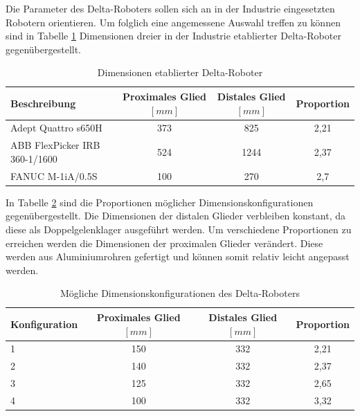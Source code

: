 \documentclass[Bachelor, BMR, ngerman]{twbook}
\begin{document}
    Die Parameter des Delta-Roboters sollen sich an in der Industrie eingesetzten Robotern orientieren. Um folglich eine angemessene Auswahl treffen zu können sind in Tabelle \ref{tab:etablierte-delta-rob} Dimensionen dreier in der Industrie etablierter Delta-Roboter gegenübergestellt.
    \begin{table}[H]
        \centering
        \caption{Dimensionen etablierter Delta-Roboter }\label{tab:etablierte-delta-rob}
            \begin{tabular}{| l | c | c | c |}\hline 
                \rowcolor[gray]{0.8} Beschreibung & Proximales Glied $[mm]$ & Distales Glied $[mm]$  & Proportion\\\hline
                Adept Quattro s650H & 373 & 825 & 2,21\\\hline
                ABB FlexPicker IRB 360-1/1600 & 524 & 1244 & 2,37\\\hline
                FANUC M-1iA/0.5S &  100 & 270 & 2,7\\\hline
            \end{tabular}
    \end{table}
    \noindent
    In Tabelle \ref{tab:dimensionskonfigurationen-delta} sind die Proportionen möglicher Dimensionskonfigurationen gegenübergestellt. Die Dimensionen der distalen Glieder verbleiben konstant, da diese als Doppelgelenklager ausgeführt werden. Um verschiedene Proportionen zu erreichen werden die Dimensionen der proximalen Glieder verändert. Diese werden aus Aluminiumrohren gefertigt und können somit relativ leicht angepasst werden.
    \begin{table}[H]
        \centering
        \caption{Mögliche Dimensionskonfigurationen des Delta-Roboters}\label{tab:dimensionskonfigurationen-delta}
            \begin{tabular}{| l | c | c | c |}\hline 
                \rowcolor[gray]{0.8} Konfiguration & Proximales Glied $[mm]$ & Distales Glied $[mm]$  & Proportion\\\hline
                1 & 150 & 332 & 2,21\\\hline
                2 & 140 & 332 & 2,37\\\hline
                3 & 125 & 332 & 2,65\\\hline
                4 & 100 & 332 & 3,32\\\hline
            \end{tabular}
    \end{table}
\end{document}
